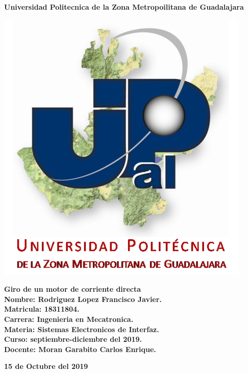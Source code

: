 \documentclass[12pt,a4paper]{article}
\author{Rodriguez Lopez Francisco Javier}
\begin{document}
\begin{center}
\LARGE \textbf{Universidad Politecnica de la Zona Metropoilitana de Guadalajara\\}


\includegraphics[scale=1]{Upzmg5.png} 

\large \textbf{Giro de un motor de corriente directa}\\
\vspace{2cm}
\large \textbf{Nombre: Rodriguez Lopez Francisco Javier.\\
\vspace{0.5cm} Matricula: 18311804.\\
\vspace{0.5cm} Carrera: Ingenieria en Mecatronica.\\
\vspace{0.5cm} Materia: Sistemas Electronicos de Interfaz.\\
\vspace{0.5cm} Curso: septiembre-diciembre del 2019.\\
\vspace{0.5cm} Docente: Moran Garabito Carlos Enrique.}


\vspace{6cm}
\small \textbf{15 de Octubre del 2019}
\end{center}
\end{document}
